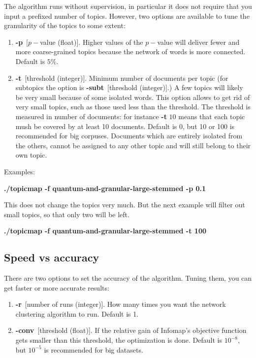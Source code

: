 \documentclass[11pt]{article}
\begin{document}
The algorithm runs without supervision, in particular it does not require that you input a prefixed number of topics. However,  two options are available to tune the granularity of the topics to some extent:

\begin{enumerate}
\item \textbf{-p}~[$p-$value (float)].
Higher values of the $p-$value will deliver fewer and  more coarse-grained topics because the network of words is more connected. Default is $5\%$.
\item \textbf{-t}~[threshold (integer)]. Minimum number of documents per topic (for subtopics the option is \textbf{-subt}~[threshold (integer)].) A few topics will likely be very small because of some isolated words. This option allows to get rid of very small topics, such as those used less than the threshold. The threshold is measured in number of documents: for instance \textbf{-t} $10$ means that each topic mush be covered by  at least 10 documents.  Default is 0, but 10 or 100 is recommended for big corpuses. \small{Documents which are entirely isolated from the others, cannot be assigned to any other topic and will still belong to their own topic.}\normalsize{}
\end{enumerate}

Examples:

\textbf{./topicmap -f quantum-and-granular-large-stemmed -p 0.1}

This does not change the topics very much. But the next example will filter out small topics, so that only two will be left.


\textbf{./topicmap -f quantum-and-granular-large-stemmed -t 100}




\subsection{Speed vs accuracy}

There are two options to set the accuracy of the algorithm. Tuning them, you can get faster or more accurate results:


\begin{enumerate}

\item \textbf{-r}~[number of runs (integer)].
How many times you want the network clustering algorithm to run. Default is 1.
\item \textbf{-conv}~[threshold (float)].
If the relative gain of Infomap's objective function gets smaller than this threshold, the optimization is done. Default is $10^{-8}$, but $10^{-5}$ is recommended for big datasets.
\end{enumerate}
\end{document}
